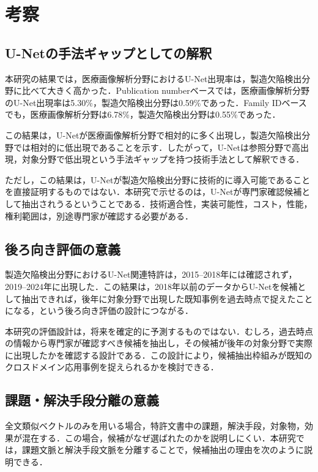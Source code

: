 \chapter{考察}

\section{U-Netの手法ギャップとしての解釈}
本研究の結果では，医療画像解析分野におけるU-Net出現率は，製造欠陥検出分野に比べて大きく高かった．Publication numberベースでは，医療画像解析分野のU-Net出現率は5.30\%，製造欠陥検出分野は0.59\%であった．Family IDベースでも，医療画像解析分野は6.78\%，製造欠陥検出分野は0.55\%であった．

この結果は，U-Netが医療画像解析分野で相対的に多く出現し，製造欠陥検出分野では相対的に低出現であることを示す．したがって，U-Netは参照分野で高出現，対象分野で低出現という手法ギャップを持つ技術手法として解釈できる．

ただし，この結果は，U-Netが製造欠陥検出分野に技術的に導入可能であることを直接証明するものではない．本研究で示せるのは，U-Netが専門家確認候補として抽出されうるということである．技術適合性，実装可能性，コスト，性能，権利範囲は，別途専門家が確認する必要がある．

\section{後ろ向き評価の意義}
製造欠陥検出分野におけるU-Net関連特許は，2015--2018年には確認されず，2019--2024年に出現した．この結果は，2018年以前のデータからU-Netを候補として抽出できれば，後年に対象分野で出現した既知事例を過去時点で捉えたことになる，という後ろ向き評価の設計につながる．

本研究の評価設計は，将来を確定的に予測するものではない．むしろ，過去時点の情報から専門家が確認すべき候補を抽出し，その候補が後年の対象分野で実際に出現したかを確認する設計である．この設計により，候補抽出枠組みが既知のクロスドメイン応用事例を捉えられるかを検討できる．

\section{課題・解決手段分離の意義}
全文類似ベクトルのみを用いる場合，特許文書中の課題，解決手段，対象物，効果が混在する．この場合，候補がなぜ選ばれたのかを説明しにくい．本研究では，課題文脈と解決手段文脈を分離することで，候補抽出の理由を次のように説明できる．

